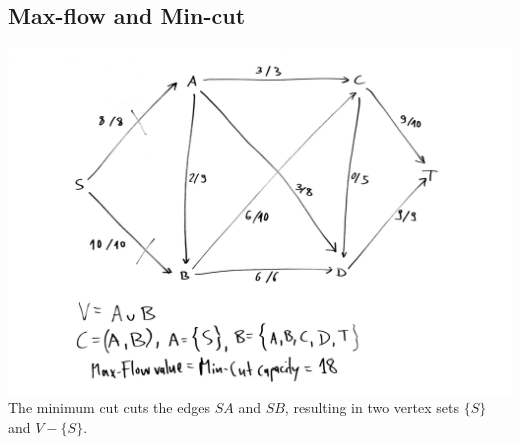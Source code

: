 \documentclass[12pt]{article}
\begin{document}
\subsection*{Max-flow and Min-cut}
\includegraphics[width=\textwidth]{6_1.pdf}
The minimum cut cuts the edges $SA$ and $SB$, resulting in two vertex sets $\{S\}$ and $V-\{S\}$.
\end{document}

